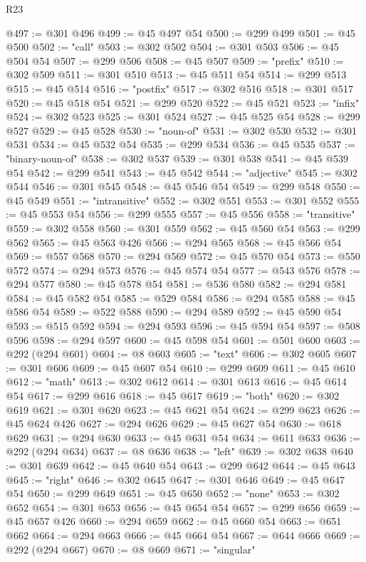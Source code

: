 \begin{lexlean}{R23}
\begin{coremodule}
@497 := @301 @496
@499 := @45 @497 @54
@500 := @299 @499
@501 := @45 @500
@502 := "call"
@503 := @302 @502
@504 := @301 @503
@506 := @45 @504 @54
@507 := @299 @506
@508 := @45 @507
@509 := "prefix"
@510 := @302 @509
@511 := @301 @510
@513 := @45 @511 @54
@514 := @299 @513
@515 := @45 @514
@516 := "postfix"
@517 := @302 @516
@518 := @301 @517
@520 := @45 @518 @54
@521 := @299 @520
@522 := @45 @521
@523 := "infix"
@524 := @302 @523
@525 := @301 @524
@527 := @45 @525 @54
@528 := @299 @527
@529 := @45 @528
@530 := "noun-of"
@531 := @302 @530
@532 := @301 @531
@534 := @45 @532 @54
@535 := @299 @534
@536 := @45 @535
@537 := "binary-noun-of"
@538 := @302 @537
@539 := @301 @538
@541 := @45 @539 @54
@542 := @299 @541
@543 := @45 @542
@544 := "adjective"
@545 := @302 @544
@546 := @301 @545
@548 := @45 @546 @54
@549 := @299 @548
@550 := @45 @549
@551 := "intransitive"
@552 := @302 @551
@553 := @301 @552
@555 := @45 @553 @54
@556 := @299 @555
@557 := @45 @556
@558 := "transitive"
@559 := @302 @558
@560 := @301 @559
@562 := @45 @560 @54
@563 := @299 @562
@565 := @45 @563 @426
@566 := @294 @565
@568 := @45 @566 @54
@569 := @557 @568
@570 := @294 @569
@572 := @45 @570 @54
@573 := @550 @572
@574 := @294 @573
@576 := @45 @574 @54
@577 := @543 @576
@578 := @294 @577
@580 := @45 @578 @54
@581 := @536 @580
@582 := @294 @581
@584 := @45 @582 @54
@585 := @529 @584
@586 := @294 @585
@588 := @45 @586 @54
@589 := @522 @588
@590 := @294 @589
@592 := @45 @590 @54
@593 := @515 @592
@594 := @294 @593
@596 := @45 @594 @54
@597 := @508 @596
@598 := @294 @597
@600 := @45 @598 @54
@601 := @501 @600
@603 := @292 (@294 @601)
@604 := @8 @603
@605 := "text"
@606 := @302 @605
@607 := @301 @606
@609 := @45 @607 @54
@610 := @299 @609
@611 := @45 @610
@612 := "math"
@613 := @302 @612
@614 := @301 @613
@616 := @45 @614 @54
@617 := @299 @616
@618 := @45 @617
@619 := "both"
@620 := @302 @619
@621 := @301 @620
@623 := @45 @621 @54
@624 := @299 @623
@626 := @45 @624 @426
@627 := @294 @626
@629 := @45 @627 @54
@630 := @618 @629
@631 := @294 @630
@633 := @45 @631 @54
@634 := @611 @633
@636 := @292 (@294 @634)
@637 := @8 @636
@638 := "left"
@639 := @302 @638
@640 := @301 @639
@642 := @45 @640 @54
@643 := @299 @642
@644 := @45 @643
@645 := "right"
@646 := @302 @645
@647 := @301 @646
@649 := @45 @647 @54
@650 := @299 @649
@651 := @45 @650
@652 := "none"
@653 := @302 @652
@654 := @301 @653
@656 := @45 @654 @54
@657 := @299 @656
@659 := @45 @657 @426
@660 := @294 @659
@662 := @45 @660 @54
@663 := @651 @662
@664 := @294 @663
@666 := @45 @664 @54
@667 := @644 @666
@669 := @292 (@294 @667)
@670 := @8 @669
@671 := "singular"

\end{coremodule}
\end{lexlean}
